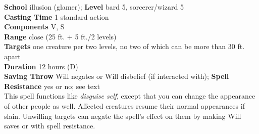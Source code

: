 \textbf{School} illusion (glamer); \textbf{Level} bard 5, sorcerer/wizard 5\\
\textbf{Casting Time} 1 standard action\\
\textbf{Components} V, S\\
\textbf{Range} close (25 ft. + 5 ft./2 levels)\\
\textbf{Targets} one creature per two levels, no two of which can be more than 30 ft. apart\\
\textbf{Duration} 12 hours (D)\\
\textbf{Saving Throw }Will negates or Will disbelief (if interacted with); \textbf{Spell Resistance} yes or no; see text\\
This spell functions like \textit{disguise self}, except that you can change the appearance of other people as well. Affected creatures resume their normal appearances if slain. Unwilling targets can negate the spell's effect on them by making Will saves or with spell resistance.\\
